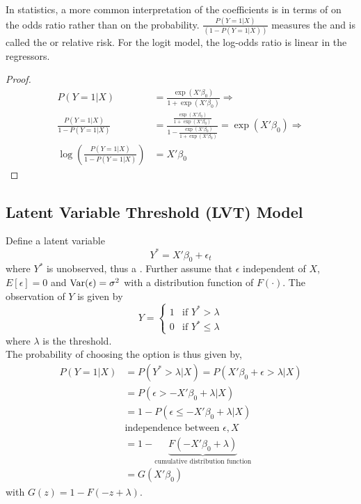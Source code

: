 In statistics, a more common interpretation of the coefficients 
is in terms of  on the odds ratio rather than on the probability.
$\frac{P(Y=1|X)}{(1-P(Y=1|X))}$ measures the 
and is called the  or relative risk.
For the logit model, the log-odds ratio is linear in the regressors.
\begin{proof}
    \begin{align*}
        P(Y=1|X) & = \frac{\exp(X'\beta_0)}{1+\exp(X'\beta_0)} \Rightarrow\\
        \frac{P(Y=1|X)}{1-P(Y=1|X)} & = \frac{\frac{\exp(X'\beta_0)}{1+\exp(X'\beta_0)}}{1-\frac{\exp(X'\beta_0)}{1+\exp(X'\beta_0)}} = \exp(X'\beta_0)\Rightarrow\\
        \log\left(\frac{P(Y=1|X)}{1-P(Y=1|X)}\right) & = X'\beta_0
    \end{align*}
\end{proof}

\subsection{Latent Variable Threshold (LVT) Model}
Define a latent variable
\begin{equation}
    Y^* = X'\beta_0 + \epsilon_t
\end{equation}
where $Y^*$ is unobserved, thus a .
Further assume that $\epsilon$ independent of $X$, $E[\epsilon]=0$ and $\operatorname{Var}(\epsilon)=\sigma^2$ with a distribution function of $F(\cdot)$.
The observation of $Y$ is given by
\begin{equation}
    Y =
    \begin{cases}
        1 & \text{if }Y^* > \lambda\\
        0 & \text{if }Y^* \leq\lambda
    \end{cases}
\end{equation}
where $\lambda$ is the threshold.\\

The probability of choosing the option is thus given by,
\begin{align*}
    P(Y=1|X) & = P(Y^*>\lambda|X) = P(X'\beta_0+\epsilon>\lambda|X)\\
    & = P(\epsilon > -X'\beta_0+\lambda|X)\\
    & = 1 - P(\epsilon \leq -X'\beta_0+\lambda|X)\\
    & \text{independence between }\epsilon, X\\
    & = 1 - \underbrace{F(-X'\beta_0+\lambda)}_{\text{cumulative distribution function}}\\
    & = G(X'\beta_0)
\end{align*}
with $G(z) = 1 - F(-z+\lambda)$.\\

